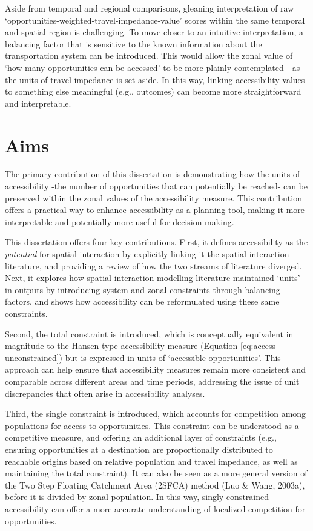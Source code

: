 \documentclass[
11pt, %
oneside, %
english, %
singlespacing, %
]{macthesis} %
\begin{document}
Aside from temporal and regional comparisons, gleaning interpretation of raw `opportunities-weighted-travel-impedance-value' scores within the same temporal and spatial region is challenging. To move closer to an intuitive interpretation, a balancing factor that is sensitive to the known information about the transportation system can be introduced. This would allow the zonal value of `how many opportunities can be accessed' to be more plainly contemplated - as the units of travel impedance is set aside. In this way, linking accessibility values to something else meaningful (e.g., outcomes) can become more straightforward and interpretable.

\section{Aims}\label{aims}

The primary contribution of this dissertation is demonstrating how the units of accessibility -the number of opportunities that can potentially be reached- can be preserved within the zonal values of the accessibility measure. This contribution offers a practical way to enhance accessibility as a planning tool, making it more interpretable and potentially more useful for decision-making.

This dissertation offers four key contributions. First, it defines accessibility as the \emph{potential} for spatial interaction by explicitly linking it the spatial interaction literature, and providing a review of how the two streams of literature diverged. Next, it explores how spatial interaction modelling literature maintained `units' in outputs by introducing system and zonal constraints through balancing factors, and shows how accessibility can be reformulated using these same constraints.

Second, the total constraint is introduced, which is conceptually equivalent in magnitude to the Hansen-type accessibility measure (Equation \ref{eq:access-unconstrained}) but is expressed in units of `accessible opportunities'. This approach can help ensure that accessibility measures remain more consistent and comparable across different areas and time periods, addressing the issue of unit discrepancies that often arise in accessibility analyses.

Third, the single constraint is introduced, which accounts for competition among populations for access to opportunities. This constraint can be understood as a competitive measure, and offering an additional layer of constraints (e.g., ensuring opportunities at a destination are proportionally distributed to reachable origins based on relative population and travel impedance, as well as maintaining the total constraint). It can also be seen as a more general version of the Two Step Floating Catchment Area (2SFCA) method (Luo \& Wang, 2003a), before it is divided by zonal population. In this way, singly-constrained accessibility can offer a more accurate understanding of localized competition for opportunities.
\end{document}
